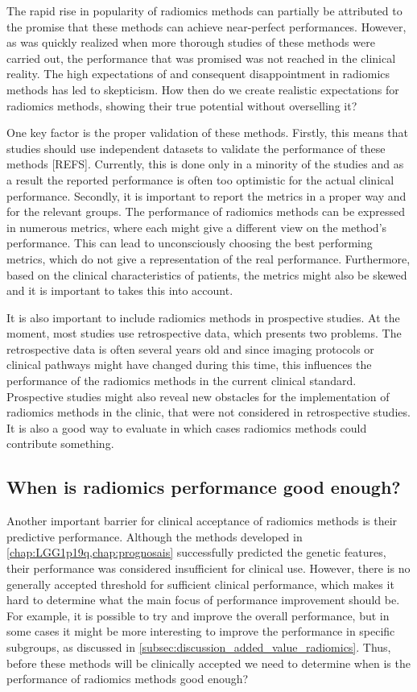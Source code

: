 The rapid rise in popularity of radiomics methods can partially be attributed to the promise that these methods can achieve near-perfect performances.
However, as was quickly realized when more thorough studies of these methods were carried out, the performance that was promised was not reached in the clinical reality.
The high expectations of and consequent disappointment in  radiomics methods has led to skepticism.
How then do we create realistic expectations for radiomics methods, showing their true potential without overselling it?

One key factor is the proper validation of these methods.
Firstly, this means that studies should use independent datasets to validate the performance of these methods [REFS].
Currently, this is done only in a minority of the studies and as a result the reported performance is often too optimistic for the actual clinical performance.
Secondly, it is important to report the metrics in a proper way and for the relevant groups.
The performance of radiomics methods can be expressed in numerous metrics, where each might give a different view on the method's performance.
This can lead to unconsciously choosing the best performing metrics, which do not give a representation of the real performance.
Furthermore, based on the clinical characteristics of patients, the metrics might also be skewed and it is important to takes this into account.

It is also important to include radiomics methods in prospective studies.
At the moment, most studies use retrospective data, which presents two problems.
The retrospective data is often several years old and since imaging protocols or clinical pathways might have changed during this time, this influences the performance of the radiomics methods in the current clinical standard.
Prospective studies might also reveal new obstacles for the implementation of radiomics methods in the clinic, that were not considered in retrospective studies.
It is also a good way to evaluate in which cases radiomics methods could contribute something.

\subsection{When is radiomics performance good enough?}

Another important barrier for clinical acceptance of radiomics methods is their predictive performance.
Although the methods developed in \cref{chap:LGG1p19q,chap:prognosais} successfully predicted the genetic features, their performance was considered insufficient for clinical use.
However, there is no generally accepted threshold for sufficient clinical performance, which makes it hard to determine what the main focus of performance improvement should be.
For example, it is possible to try and improve the overall performance, but in some cases it might be more interesting to improve the performance in specific subgroups, as discussed in \cref{subsec:discussion_added_value_radiomics}.
Thus, before these methods will be clinically accepted we need to determine when is the performance of radiomics methods good enough?

